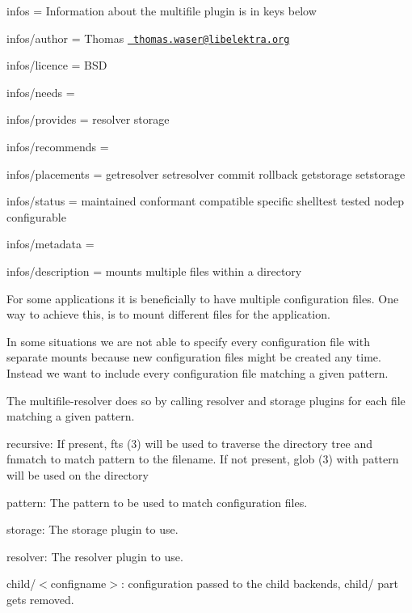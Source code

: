 
\begin{DoxyItemize}
\item infos = Information about the multifile plugin is in keys below
\item infos/author = Thomas \href{mailto:thomas.waser@libelektra.org}{\texttt{ thomas.\+waser@libelektra.\+org}}
\item infos/licence = B\+SD
\item infos/needs =
\item infos/provides = resolver storage
\item infos/recommends =
\item infos/placements = getresolver setresolver commit rollback getstorage setstorage
\item infos/status = maintained conformant compatible specific shelltest tested nodep configurable
\item infos/metadata =
\item infos/description = mounts multiple files within a directory
\end{DoxyItemize}

For some applications it is beneficially to have multiple configuration files. One way to achieve this, is to mount different files for the application.

In some situations we are not able to specify every configuration file with separate mounts because new configuration files might be created any time. Instead we want to include every configuration file matching a given pattern.

The multifile-\/resolver does so by calling resolver and storage plugins for each file matching a given pattern.


\begin{DoxyItemize}
\item {\ttfamily recursive}\+: If present, fts (3) will be used to traverse the directory tree and fnmatch to match {\ttfamily pattern} to the filename. If not present, glob (3) with {\ttfamily pattern} will be used on the directory
\item {\ttfamily pattern}\+: The pattern to be used to match configuration files.
\item {\ttfamily storage}\+: The storage plugin to use.
\item {\ttfamily resolver}\+: The resolver plugin to use.
\item \textquotesingle{}child/$<$configname$>$\textquotesingle{}\+: configuration passed to the child backends, {\ttfamily child/} part gets removed.
\end{DoxyItemize}

